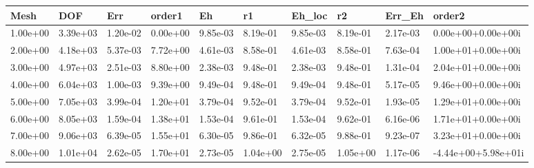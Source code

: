 \begin{tabular}{llllllllll}
Mesh & DOF & Err & order1 & Eh & r1 & Eh_loc & r2 & Err_Eh & order2 \\ 
\hline 
1.00e+00 & 3.39e+03 & 1.20e-02 & 0.00e+00 & 9.85e-03 & 8.19e-01 & 9.85e-03 & 8.19e-01 & 2.17e-03 &  0.00e+00+0.00e+00i \\ 
2.00e+00 & 4.18e+03 & 5.37e-03 & 7.72e+00 & 4.61e-03 & 8.58e-01 & 4.61e-03 & 8.58e-01 & 7.63e-04 &  1.00e+01+0.00e+00i \\ 
3.00e+00 & 4.97e+03 & 2.51e-03 & 8.80e+00 & 2.38e-03 & 9.48e-01 & 2.38e-03 & 9.48e-01 & 1.31e-04 &  2.04e+01+0.00e+00i \\ 
4.00e+00 & 6.04e+03 & 1.00e-03 & 9.39e+00 & 9.49e-04 & 9.48e-01 & 9.49e-04 & 9.48e-01 & 5.17e-05 &  9.46e+00+0.00e+00i \\ 
5.00e+00 & 7.05e+03 & 3.99e-04 & 1.20e+01 & 3.79e-04 & 9.52e-01 & 3.79e-04 & 9.52e-01 & 1.93e-05 &  1.29e+01+0.00e+00i \\ 
6.00e+00 & 8.05e+03 & 1.59e-04 & 1.38e+01 & 1.53e-04 & 9.61e-01 & 1.53e-04 & 9.62e-01 & 6.16e-06 &  1.71e+01+0.00e+00i \\ 
7.00e+00 & 9.06e+03 & 6.39e-05 & 1.55e+01 & 6.30e-05 & 9.86e-01 & 6.32e-05 & 9.88e-01 & 9.23e-07 &  3.23e+01+0.00e+00i \\ 
8.00e+00 & 1.01e+04 & 2.62e-05 & 1.70e+01 & 2.73e-05 & 1.04e+00 & 2.75e-05 & 1.05e+00 & 1.17e-06 & -4.44e+00+5.98e+01i \\ 
\hline 
\end{tabular}